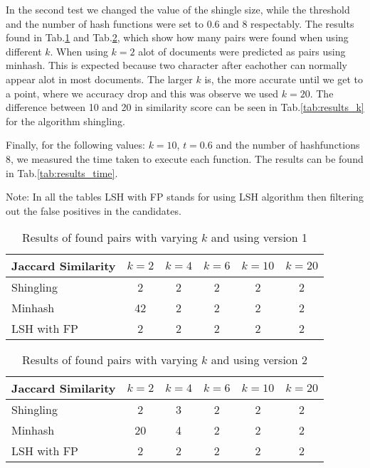 \documentclass[a4paper, 11pt]{article}
\begin{document}
In the second test we changed the value of the shingle size, while the threshold and the number of hash functions were set to 0.6 and 8 respectably. The results found in Tab.\ref{tab:results_k_1} and Tab.\ref{tab:results_k_2}, which show how many pairs were found when using different $k$. 
 When using $k=2$ alot of documents were predicted as pairs using minhash. This is expected because two character after eachother can normally appear alot in most documents. The larger $k$ is, the more accurate until we get to a point, where we accuracy drop and this was observe we used $k=20$. The difference between 10 and 20 in similarity score can be seen in Tab.\ref{tab:results_k} for the algorithm shingling.

Finally, for the following values: $k=10$, $t=0.6$ and the number of hashfunctions 8, we measured the time taken to execute each function. The results can be found in Tab.\ref{tab:results_time}.

Note: In all the tables LSH with FP stands for using LSH algorithm then filtering out the false positives in the candidates.

\begin{table}[H]
	\centering
	\begin{tabular}{|l|c|c|c|c|c|} 
		\hline
		Jaccard Similarity & $k = 2$ & $k = 4$ & $k=6$ & $k=10$ &$k=20$\\\hline
		Shingling & 2 &2  & 2& 2 & 2 \\
		Minhash & 42 &2 & 2&2 &2\\
		LSH with FP & 2& 2& 2& 2& 2\\
	\hline
\end{tabular}
\caption{Results of found pairs with varying $k$ and using version 1}
\label{tab:results_k_1}
\end{table}

\begin{table}[H]
	\centering
	\begin{tabular}{|l|c|c|c|c|c|} 
		\hline
		Jaccard Similarity & $k = 2$ & $k = 4$ & $k=6$ & $k=10$ &$k=20$\\\hline
		Shingling & 2 & 3  & 2 & 2 & 2 \\
		Minhash & 20 & 4 & 2&2 &2\\
		LSH with FP & 2& 2 & 2&2&2 \\
		\hline
	\end{tabular}
	\caption{Results of found pairs with varying $k$ and using version  2}
	\label{tab:results_k_2}
\end{table}
\end{document}

